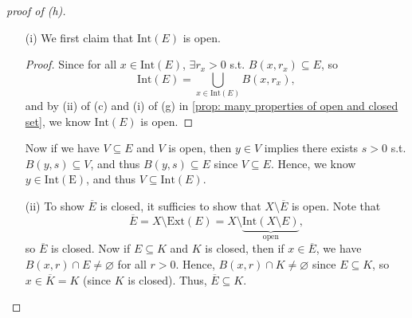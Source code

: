     \begin{proof}[proof of (h)]
        \vphantom{text}
        \begin{itemize}
            \item [(i)] 
            We first claim that \(\mathrm{Int}(E) \) is open. 
            \begin{proof}
                Since for all \(x \in \mathrm{Int}(E) \), \(\exists r_x > 0\) s.t. \(B(x, r_x) \subseteq E\), so   
        \[
            \mathrm{Int}(E) = \bigcup_{x \in \mathrm{Int}(E) } B(x, r_x),  
        \] and by (ii) of (c) and (i) of (g) in \autoref{prop: many properties of open and closed set}, we know \(\mathrm{Int}(E)\) is open.  
    \end{proof}
        Now if we have \(V \subseteq E\) and \(V\) is open, then \(y \in V\) implies there exists \(s > 0\) s.t. \(B(y, s) \subseteq V\), and thus \(B(y, s) \subseteq E\) since \(V \subseteq E\). Hence, we know \(y \in \mathrm{Int(E)} \), and thus \(V \subseteq \mathrm{Int}(E) \). 
        \item [(ii)] To show \(\overline{E} \) is closed, it sufficies to show that \(X \setminus \overline{E} \) is open. Note that
\[
    \overline{E} = X \setminus \mathrm{Ext}(E) = X \setminus \underbrace{ \mathrm{Int}(X \setminus E) }_{\text{open}},
\]  so \(\overline{E} \) is closed. Now if \(E \subseteq K\) and \(K\) is closed, then if \(x \in \overline{E} \), we have \(B(x, r) \cap E \neq \varnothing \) for all \(r > 0\). Hence, \(B(x, r) \cap K \neq  \varnothing \) since \(E \subseteq K\), so \(x \in \overline{K} = K \) (since \(K\) is closed). Thus, \(\overline{E} \subseteq K\). 
    \end{itemize}
           
\end{proof}

